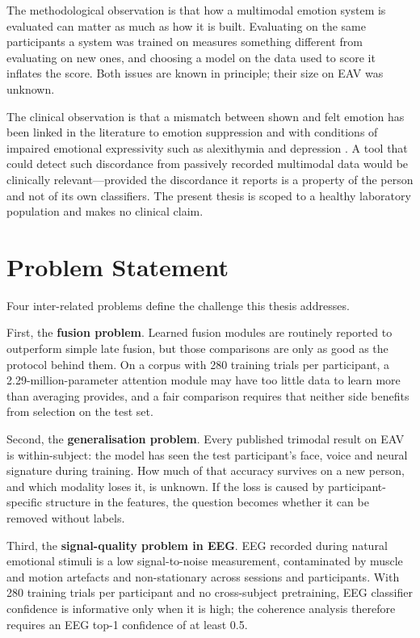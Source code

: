 The methodological observation is that how a multimodal emotion system is evaluated can matter as much as how it is built. Evaluating on the same participants a system was trained on measures something different from evaluating on new ones, and choosing a model on the data used to score it inflates the score. Both issues are known in principle; their size on EAV was unknown.

The clinical observation is that a mismatch between shown and felt emotion has been linked in the literature to emotion suppression and with conditions of impaired emotional expressivity such as alexithymia and depression \cite{Gross1998EmotionRegulation,Mauss2009Measures}. A tool that could detect such discordance from passively recorded multimodal data would be clinically relevant---provided the discordance it reports is a property of the person and not of its own classifiers. The present thesis is scoped to a healthy laboratory population and makes no clinical claim.

\section{Problem Statement}
Four inter-related problems define the challenge this thesis addresses.

First, the \textbf{fusion problem}. Learned fusion modules are routinely reported to outperform simple late fusion, but those comparisons are only as good as the protocol behind them. On a corpus with 280 training trials per participant, a 2.29-million-parameter attention module may have too little data to learn more than averaging provides, and a fair comparison requires that neither side benefits from selection on the test set.

Second, the \textbf{generalisation problem}. Every published trimodal result on EAV is within-subject: the model has seen the test participant's face, voice and neural signature during training. How much of that accuracy survives on a new person, and which modality loses it, is unknown. If the loss is caused by participant-specific structure in the features, the question becomes whether it can be removed without labels.

Third, the \textbf{signal-quality problem in EEG}. EEG recorded during natural emotional stimuli is a low signal-to-noise measurement, contaminated by muscle and motion artefacts and non-stationary across sessions and participants. With 280 training trials per participant and no cross-subject pretraining, EEG classifier confidence is informative only when it is high; the coherence analysis therefore requires an EEG top-1 confidence of at least 0.5.

